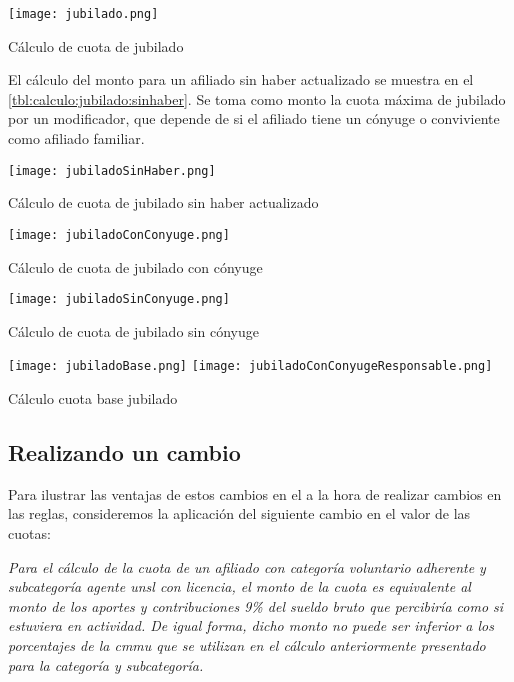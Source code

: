 \begin{table*}
    \centering
    \texttt{[image: jubilado.png]}
    \caption{Cálculo de cuota de jubilado}
    \label{tbl:calculo:jubilado:1}
\end{table*}

El cálculo del monto para un afiliado sin haber actualizado se muestra en el \cref{tbl:calculo:jubilado:sinhaber}.
Se toma como monto la cuota máxima de jubilado por un modificador, que depende de si el afiliado tiene un cónyuge o conviviente como afiliado familiar.

\begin{table*}
    \centering
    \texttt{[image: jubiladoSinHaber.png]}
    \caption{Cálculo de cuota de jubilado sin haber actualizado}
    \label{tbl:calculo:jubilado:sinhaber}
\end{table*}


\begin{table*}
    \centering
    \texttt{[image: jubiladoConConyuge.png]}
    \caption{Cálculo de cuota de jubilado con cónyuge}
    \label{tbl:calculo:jubilado:conconyuge}
\end{table*}


\begin{table*}
    \centering
    \texttt{[image: jubiladoSinConyuge.png]}
    \caption{Cálculo de cuota de jubilado sin cónyuge}
    \label{tbl:calculo:jubilado:sinconyuge}
\end{table*}


\begin{table*}
    \centering
    \texttt{[image: jubiladoBase.png]}
    \texttt{[image: jubiladoConConyugeResponsable.png]}
    \caption{Cálculo cuota base jubilado}
    \label{tbl:calculo:jubilado}
\end{table*}

\subsection{Realizando un cambio}\label{ssec:integracion:cambio}
Para ilustrar las ventajas de estos cambios en el \SIDOSPU a la hora de realizar cambios en las reglas, consideremos la aplicación del siguiente cambio en el valor de las cuotas:

\emph{
    Para el cálculo de la cuota de un afiliado con categoría voluntario adherente y subcategoría agente \acrshort{unsl} con licencia, el monto de la cuota es equivalente al monto de los aportes y contribuciones 9\% del sueldo bruto que percibiría como si estuviera en actividad. De igual forma, dicho monto no puede ser inferior a los porcentajes de la \acrshort{cmmu} que se utilizan en el cálculo anteriormente presentado para la categoría y subcategoría.
}

